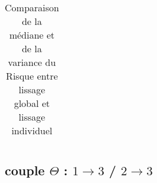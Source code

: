 \begin{table}[H]
\begin{tabularx}{\textwidth}{ccccXXXX}
	\bottomrule
\end{tabularx}
\caption{Comparaison de la médiane et de la variance du Risque entre lissage global et lissage individuel}
\label{tab:couple_1312_indiv_vs_glob}
\end{table}

\subsection{couple $\Theta$ : $1 \rightarrow 3$ / $2 \rightarrow 3$}




